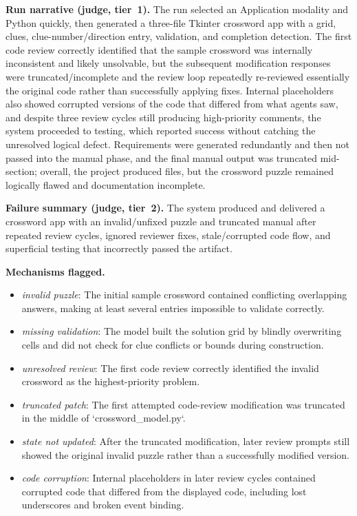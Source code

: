 \textbf{Run narrative (judge, tier~1).} The run selected an Application modality and Python quickly, then generated a three-file Tkinter crossword app with a grid, clues, clue-number/direction entry, validation, and completion detection. The first code review correctly identified that the sample crossword was internally inconsistent and likely unsolvable, but the subsequent modification responses were truncated/incomplete and the review loop repeatedly re-reviewed essentially the original code rather than successfully applying fixes. Internal placeholders also showed corrupted versions of the code that differed from what agents saw, and despite three review cycles still producing high-priority comments, the system proceeded to testing, which reported success without catching the unresolved logical defect. Requirements were generated redundantly and then not passed into the manual phase, and the final manual output was truncated mid-section; overall, the project produced files, but the crossword puzzle remained logically flawed and documentation incomplete.

\textbf{Failure summary (judge, tier~2).} The system produced and delivered a crossword app with an invalid/unfixed puzzle and truncated manual after repeated review cycles, ignored reviewer fixes, stale/corrupted code flow, and superficial testing that incorrectly passed the artifact.

\textbf{Mechanisms flagged.}
\begin{itemize}
  \item \emph{invalid puzzle}: The initial sample crossword contained conflicting overlapping answers, making at least several entries impossible to validate correctly.
  \item \emph{missing validation}: The model built the solution grid by blindly overwriting cells and did not check for clue conflicts or bounds during construction.
  \item \emph{unresolved review}: The first code review correctly identified the invalid crossword as the highest-priority problem.
  \item \emph{truncated patch}: The first attempted code-review modification was truncated in the middle of `crossword\_model.py`.
  \item \emph{state not updated}: After the truncated modification, later review prompts still showed the original invalid puzzle rather than a successfully modified version.
  \item \emph{code corruption}: Internal placeholders in later review cycles contained corrupted code that differed from the displayed code, including lost underscores and broken event binding.
\end{itemize}

